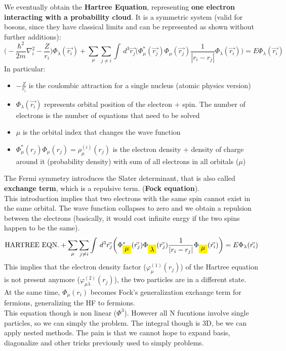 We eventually obtain the \textbf{Hartree Equation}, representing \textbf{one electron interacting with a probability cloud}. 
It is a symmetric system (valid for bosons, since they have classical limits and can be represented as shown without further additions):
\[
\bigg(-\frac{\hbar^2}{2m}\nabla^2_i-\frac{Z}{r_i}\bigg)\Phi_\lambda(\vec{r_i})+\sum_\mu \sum_{j \neq i} \int\,d^3\vec{r_j}\bigg(\Phi^*_\mu(\vec{r_j})\Phi_\mu(\vec{r_j})\frac{1}{|r_i-r_j|}\Phi_\lambda(\vec{r_i})\bigg)=E\Phi_\lambda(\vec{r_i})
\]
In particular:
\begin{itemize}
	\item $-\frac{Z}{r_i}$ is the coulombic attraction for a single nucleus (atomic physics version)
	\item $\Phi_\lambda(\vec{r_i})$ represents orbital position of the electron + spin. The number of electrons is the number of equations that need to be solved
	\item $\mu$ is the orbital index that changes the wave function
	\item $\Phi^*_\mu(r_j)\Phi_\mu(r_j) = \rho_\mu^{(i)}(r_j)$ is the electron density + density of charge around it (probability density) with sum of all electrons in all orbitals ($\mu$)
\end{itemize}
The Fermi symmetry introduces the Slater determinant, that is also called \textbf{exchange term}, which is a repulsive term. (\textbf{Fock equation}). \\
This introduction implies that two electrons with the same spin cannot exist in the same orbital. 
The wave function collapses to zero and we obtain a repulsion between the electrons (basically, it would cost infinite enrgy if the two spins happen to be the same).\\
\[
\text{HARTREE EQN.}+
\sum_\mu \sum_{j \neq i} \int\,d^3\vec{r_j}\bigg(\Phi^*_{\mathcolorbox{yellow}{\mu}}(\vec{r_j})\Phi_{\mathcolorbox{yellow}{\lambda}}(\vec{r_j})\frac{1}{|r_i-r_j|}\Phi_{\mathcolorbox{yellow}{\mu}}(\vec{r_i})\bigg)=E\Phi_\lambda(\vec{r_i})
\]
This implies that the electron density factor ($\varphi^{(1)}_\mu(r_j)$) of the Hartree equation is not present anymore ($\varphi^{(2)}_{\mu\lambda}(r_j)$), the two particles are in a different state. \\
At the same time, $\Phi_\mu(r_i)$ becomes Fock's generalization exchange term for fermions, generalizing the HF to fermions. \\
This equation though is non linear ($\Phi^3$). However all N fucntions involve single particles, so we can simply the problem. The integral though is 3D, be we can apply nested methods. The pain is that we cannot hope to expand basis, diagonalize and other tricks previously used to simply problems.\\
